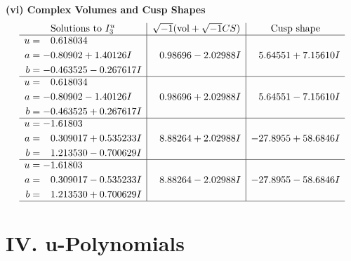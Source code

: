 \documentclass[1p]{elsarticle_modified}
\theoremstyle{definition}
\newcommand{\I}{\sqrt{-1}}
\begin{document}
\newpage\flushleft \textbf{(vi) Complex Volumes and Cusp Shapes}
$$\begin{array}{c|c|c}  
\text{Solutions to }I^u_{3}& \I (\text{vol} + \sqrt{-1}CS) & \text{Cusp shape}\\
 \hline 
\begin{aligned}
u &= \phantom{-}0.618034\phantom{ +0.000000I} \\
a &= -0.80902 + 1.40126 I \\
b &= -0.463525 - 0.267617 I\end{aligned}
 & \phantom{-}0.98696 - 2.02988 I & \phantom{-}5.64551 + 7.15610 I \\ \hline\begin{aligned}
u &= \phantom{-}0.618034\phantom{ +0.000000I} \\
a &= -0.80902 - 1.40126 I \\
b &= -0.463525 + 0.267617 I\end{aligned}
 & \phantom{-}0.98696 + 2.02988 I & \phantom{-}5.64551 - 7.15610 I \\ \hline\begin{aligned}
u &= -1.61803\phantom{ +0.000000I} \\
a &= \phantom{-}0.309017 + 0.535233 I \\
b &= \phantom{-}1.213530 - 0.700629 I\end{aligned}
 & \phantom{-}8.88264 + 2.02988 I & -27.8955 + 58.6846 I \\ \hline\begin{aligned}
u &= -1.61803\phantom{ +0.000000I} \\
a &= \phantom{-}0.309017 - 0.535233 I \\
b &= \phantom{-}1.213530 + 0.700629 I\end{aligned}
 & \phantom{-}8.88264 - 2.02988 I & -27.8955 - 58.6846 I\\
 \hline 
 \end{array}$$\newpage
\newpage\renewcommand{\arraystretch}{1}
\centering \section*{ IV. u-Polynomials}
\end{document}

